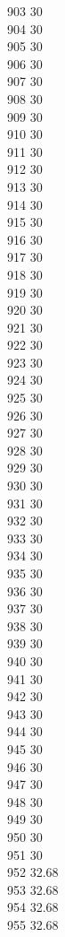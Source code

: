 903	30\\
904	30\\
905	30\\
906	30\\
907	30\\
908	30\\
909	30\\
910	30\\
911	30\\
912	30\\
913	30\\
914	30\\
915	30\\
916	30\\
917	30\\
918	30\\
919	30\\
920	30\\
921	30\\
922	30\\
923	30\\
924	30\\
925	30\\
926	30\\
927	30\\
928	30\\
929	30\\
930	30\\
931	30\\
932	30\\
933	30\\
934	30\\
935	30\\
936	30\\
937	30\\
938	30\\
939	30\\
940	30\\
941	30\\
942	30\\
943	30\\
944	30\\
945	30\\
946	30\\
947	30\\
948	30\\
949	30\\
950	30\\
951	30\\
952	32.68\\
953	32.68\\
954	32.68\\
955	32.68\\
